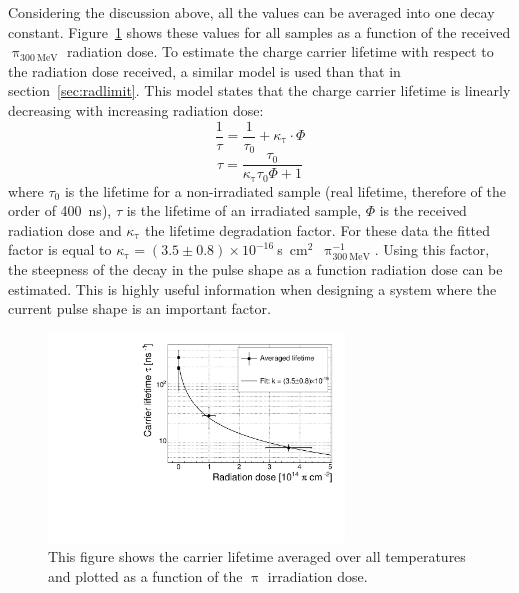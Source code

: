 Considering the discussion above, all the values can be averaged into one decay constant. Figure~\ref{fig:lifetimevsdose} shows these values for all samples as a function of the received $\uppi_\mathrm{300~MeV}$ radiation dose. To estimate the charge carrier lifetime with respect to the radiation dose received, a similar model is used than that in section~\ref{sec:radlimit}. This model states that the charge carrier lifetime is linearly decreasing with increasing radiation dose:
\begin{equation}
\label{eq:ltfactor}
\frac{1}{\tau} = \frac{1}{\tau_\mathrm{0}}+\kappa_{\mathrm{\tau}}\cdot\Phi
\end{equation} 
\begin{equation}
\label{eq:ltfactor1}
\tau = \frac{\tau_\mathrm{0}}{\kappa_{\mathrm{\tau}} \tau_\mathrm{0} \Phi + 1}
\end{equation} 
where $\tau_\mathrm{0}$ is the lifetime for a non-irradiated sample (real lifetime, therefore of the order of 400~ns), $\tau$ is the lifetime of an irradiated sample, $\Phi$ is the received radiation dose and $\kappa_{\mathrm{\tau}}$ the lifetime degradation factor. For these data the fitted factor is equal to $\kappa_{\mathrm{\tau}}=(3.5\pm0.8)\times10^{-16}~$s~cm$^2$~$\uppi_{\mathrm{300~MeV}}^{-1}$. Using this factor, the steepness of the decay in the pulse shape as a function radiation dose can be estimated. This is highly useful information when designing a system where the current pulse shape is an important factor.


\begin{figure}[!t]
\centering
\includegraphics[width=0.7\textwidth]{03_measurement_results/scripts/plots/taunew/avglifetime} 
\caption{This figure shows the carrier lifetime averaged over all temperatures and plotted as a function of the $\uppi$ irradiation dose.}
\label{fig:lifetimevsdose}
\end{figure}








